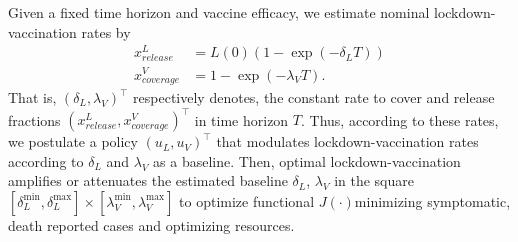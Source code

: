     Given a fixed time horizon and vaccine efficacy,
we estimate nominal lockdown-vaccination rates by 
\begin{equation}
    \begin{aligned}
        x^L_{release} &= L(0)(1 - \exp(-\delta_L T))
        \\
        x^V_{coverage} &= 1 - \exp(-\lambda_V T) .      
    \end{aligned}
\end{equation}
    That is, $(\delta_L, \lambda_V)^{\top}$ respectively denotes, 
the constant rate to cover and release fractions 
$(x^L_{release}, x_{coverage} ^ V)^{\top}$ in time horizon $T$.
Thus, according to these rates, we postulate a policy $(u_L, u_V)^{\top}$ that
modulates lockdown-vaccination rates according to 
$\delta_L$ and  $\lambda_V$ as a baseline. Then,
optimal lockdown-vaccination amplifies or attenuates the estimated baseline
$\delta_L$, $\lambda_V$ in the square
$\textbf{}
    [\delta_L ^ {\min}, \delta_L ^ {\max}] \times
    [\lambda_V ^ {\min}, \lambda_V ^ {\max}]
\textbf{}$
to optimize functional $J(\cdot)$\textemdash minimizing
symptomatic, death reported cases and optimizing resources.

